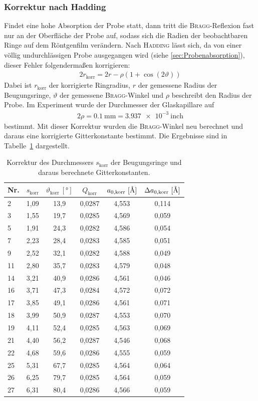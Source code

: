 \documentclass[a4paper,twoside,final]{article}
\begin{document}
\subsubsection{Korrektur nach Hadding}
Findet eine hohe Absorption der Probe statt, dann tritt die \textsc{Bragg}-Reflexion fast nur an der Oberfläche der Probe auf, sodass sich die Radien der beobachtbaren Ringe auf dem Röntgenfilm verändern. Nach \textsc{Hadding} lässt sich, da von einer völlig undurchlässigen Probe ausgegangen wird (siehe \ref{sec:Probenabsorption}), dieser Fehler folgendermaßen korrigieren:
\begin{align}
  2r_\text{korr} = 2r - \rho (1+\cos(2\vartheta))
\end{align}
Dabei ist $r_\text{korr}$ der korrigierte Ringradius, $r$ der gemessene Radius der Beugungsringe, $\vartheta$ der gemessene \textsc{Bragg}-Winkel und $\rho$ beschreibt den Radius der Probe. Im Experiment wurde der Durchmesser der Glaskapillare auf
\begin{align}
  2\rho = \SI{0,1}{\milli\metre} = \SI{3,937e-3}{\text{inch}}
\end{align}
bestimmt. Mit dieser Korrektur wurden die \textsc{Bragg}-Winkel neu berechnet und daraus eine korrigierte Gitterkonstante bestimmt. Die Ergebnisse sind in Tabelle~\ref{tab:Hadding} dargestellt.
\begin{table}[ht]
	\centering
	\caption{Korrektur des Durchmessers $s_\text{korr}$ der Beugungsringe und daraus berechnete Gitterkonstanten.}
	\label{tab:Hadding}
	\begin{tabular}{l c c c c c}
		\toprule
      Nr. & $s_\text{korr}$ & $\vartheta_\text{korr}~[\si{\degree}]$ & $Q_\text{korr}$ & $a_{0,\text{korr}}~[\si{\textup{\AA}}]$ & $\Delta a_{0,\text{korr}}~[\si{\textup{\AA}}]$\\
    \midrule
    2  & 1,09 & 13,9 & 0,0287 & 4,553 & 0,114 \\
    3  & 1,55 & 19,7 & 0,0285 & 4,569 & 0,059 \\
    5  & 1,91 & 24,3 & 0,0282 & 4,586 & 0,054 \\
    7  & 2,23 & 28,4 & 0,0283 & 4,585 & 0,051 \\
    9  & 2,52 & 32,1 & 0,0282 & 4,588 & 0,049 \\
    11 & 2,80 & 35,7 & 0,0283 & 4,579 & 0,048 \\
    14 & 3,21 & 40,9 & 0,0286 & 4,561 & 0,046 \\
    16 & 3,71 & 47,3 & 0,0284 & 4,572 & 0,072 \\
    17 & 3,85 & 49,1 & 0,0286 & 4,561 & 0,071 \\
    18 & 3,99 & 50,9 & 0,0287 & 4,553 & 0,070 \\
    19 & 4,11 & 52,4 & 0,0285 & 4,563 & 0,069 \\
    21 & 4,40 & 56,2 & 0,0287 & 4,546 & 0,068 \\
    22 & 4,68 & 59,6 & 0,0286 & 4,555 & 0,059 \\
    25 & 5,31 & 67,7 & 0,0285 & 4,564 & 0,064 \\
    26 & 6,25 & 79,7 & 0,0285 & 4,564 & 0,059 \\
    27 & 6,31 & 80,4 & 0,0286 & 4,566 & 0,059
	\end{tabular}
\end{table}
\end{document}
